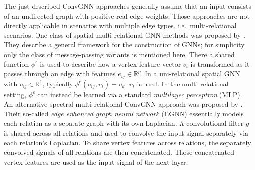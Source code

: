 \documentclass[12pt]{scrartcl}
\begin{document}
\begin{enumerate}[label=\textbf{\arabic*.}]
		The just described ConvGNN approaches generally assume that an input consists of an undirected graph with positive real edge weights.
		Those approaches are not directly applicable in scenarios with multiple edge types, i.e.\ multi-relational scenarios.
		One class of spatial multi-relational GNN methods was proposed by \citet{Battaglia2018}.
		They describe a general framework for the construction of GNNs; for simplicity only the class of message-passing variants is mentioned here.
		There a shared function $\phi^e$ is used to describe how a vertex feature vector $v_i$ is transformed as it passes through an edge with features $e_{ij} \in \mathbb{R}^p$.
		In a uni-relational spatial GNN with $e_{ij} \in \mathbb{R}^{1}$, typically $\phi^e(e_{ij}, v_i) = e_k \cdot v_i$ is used.
		In the multi-relational setting, $\phi^e$ can instead be learned via a standard \textit{multilayer perceptron} (MLP).
		An alternative spectral multi-relational ConvGNN approach was proposed by \citet{Gong2018}.
		Their so-called \textit{edge enhanced graph neural network} (EGNN) essentially models each relation as a separate graph with its own Laplacian.
		A convolutional filter $g$ is shared across all relations and used to convolve the input signal separately via each relation's Laplacian.
		To share vertex features across relations, the separately convolved signals of all relations are then concatenated.
		Those concatenated vertex features are used as the input signal of the next layer.


\end{enumerate}
\end{document}
